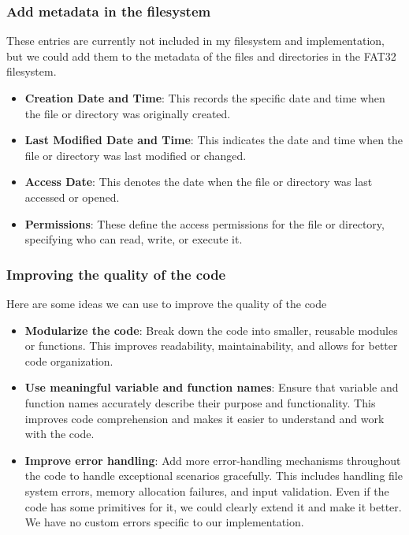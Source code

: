 {\subsubsection{Add metadata in the filesystem}

These entries are currently not included in my filesystem and implementation, but we could add them to the metadata of the files and directories in the FAT32 filesystem.

\begin{itemize}
    \item \textbf{Creation Date and Time}: This records the specific date and time when the file or directory was originally created.

    \item \textbf{Last Modified Date and Time}: This indicates the date and time when the file or directory was last modified or changed.

    \item \textbf{Access Date}: This denotes the date when the file or directory was last accessed or opened.
    
    \item \textbf{Permissions}: These define the access permissions for the file or directory, specifying who can read, write, or execute it.
\end{itemize}

\subsubsection{Improving the quality of the code}

Here are some ideas we can use to improve the quality of the code

\begin{itemize}
    \item \textbf{Modularize the code}: Break down the code into smaller, reusable modules or functions. This improves readability, maintainability, and allows for better code organization.

    \item \textbf{Use meaningful variable and function names}: Ensure that variable and function names accurately describe their purpose and functionality. This improves code comprehension and makes it easier to understand and work with the code.

    \item \textbf{Improve error handling}: Add more error-handling mechanisms throughout the code to handle exceptional scenarios gracefully. This includes handling file system errors, memory allocation failures, and input validation. Even if the code has some primitives for it, we could clearly extend it and make it better. We have no custom errors specific to our implementation.


\end{itemize}}
